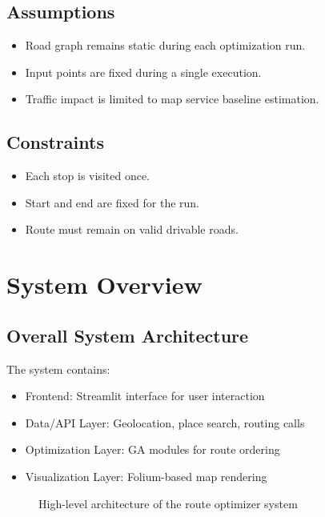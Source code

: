 \documentclass[12pt,a4paper]{report}
\begin{document}
\section{Assumptions}
\begin{itemize}
    \item Road graph remains static during each optimization run.
    \item Input points are fixed during a single execution.
    \item Traffic impact is limited to map service baseline estimation.
\end{itemize}

\section{Constraints}
\begin{itemize}
    \item Each stop is visited once.
    \item Start and end are fixed for the run.
    \item Route must remain on valid drivable roads.
\end{itemize}

\chapter{System Overview}

\section{Overall System Architecture}
The system contains:
\begin{itemize}
    \item Frontend: Streamlit interface for user interaction
    \item Data/API Layer: Geolocation, place search, routing calls
    \item Optimization Layer: GA modules for route ordering
    \item Visualization Layer: Folium-based map rendering
\end{itemize}

\begin{figure}[H]
\centering
{}
\caption{High-level architecture of the route optimizer system}
\label{fig:architecture}
\end{figure}
\end{document}
